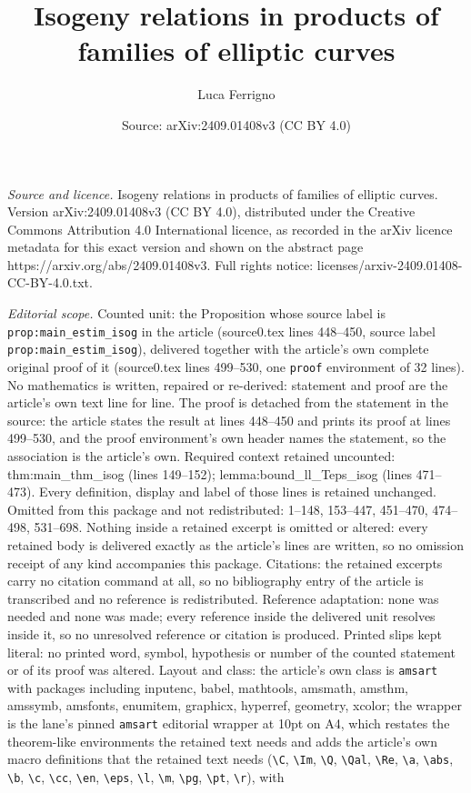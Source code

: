 \documentclass[10pt,a4paper]{amsart}
\title[Isogeny relations in products of families of elliptic curves]{Isogeny relations in products of families of elliptic curves}
\author{Luca Ferrigno}
\date{Source: arXiv:2409.01408v3 (CC BY 4.0)}
\begin{document}
\maketitle

\noindent\emph{Source and licence.} Isogeny relations in products of families of elliptic curves. Version arXiv:2409.01408v3 (CC BY 4.0), distributed under the Creative Commons Attribution 4.0 International licence, as recorded in the arXiv licence metadata for this exact version and shown on the abstract page https://arxiv.org/abs/2409.01408v3. Full rights notice: licenses/arxiv-2409.01408-CC-BY-4.0.txt.\par\smallskip

\noindent\textit{Editorial scope.} Counted unit: the Proposition whose source label is \texttt{prop:main\_estim\_isog} in the article (source0.tex lines 448--450, source label \texttt{prop:main\_estim\_isog}), delivered together with the article's own complete original proof of it (source0.tex lines 499--530, one \texttt{proof} environment of 32 lines). No mathematics is written, repaired or re-derived: statement and proof are the article's own text line for line. The proof is detached from the statement in the source: the article states the result at lines 448--450 and prints its proof at lines 499--530, and the proof environment's own header names the statement, so the association is the article's own. Required context retained uncounted: thm:main\_thm\_isog (lines 149--152); lemma:bound\_ll\_Teps\_isog (lines 471--473). Every definition, display and label of those lines is retained unchanged. Omitted from this package and not redistributed: 1--148, 153--447, 451--470, 474--498, 531--698. Nothing inside a retained excerpt is omitted or altered: every retained body is delivered exactly as the article's lines are written, so no omission receipt of any kind accompanies this package. Citations: the retained excerpts carry no citation command at all, so no bibliography entry of the article is transcribed and no reference is redistributed. Reference adaptation: none was needed and none was made; every reference inside the delivered unit resolves inside it, so no unresolved reference or citation is produced. Printed slips kept literal: no printed word, symbol, hypothesis or number of the counted statement or of its proof was altered. Layout and class: the article's own class is \texttt{amsart} with packages including inputenc, babel, mathtools, amsmath, amsthm, amssymb, amsfonts, enumitem, graphicx, hyperref, geometry, xcolor; the wrapper is the lane's pinned \texttt{amsart} editorial wrapper at 10pt on A4, which restates the theorem-like environments the retained text needs and adds the article's own macro definitions that the retained text needs (\texttt{\textbackslash C}, \texttt{\textbackslash Im}, \texttt{\textbackslash Q}, \texttt{\textbackslash Qal}, \texttt{\textbackslash Re}, \texttt{\textbackslash a}, \texttt{\textbackslash abs}, \texttt{\textbackslash b}, \texttt{\textbackslash c}, \texttt{\textbackslash cc}, \texttt{\textbackslash en}, \texttt{\textbackslash eps}, \texttt{\textbackslash l}, \texttt{\textbackslash m}, \texttt{\textbackslash pg}, \texttt{\textbackslash pt}, \texttt{\textbackslash r}), with 
\end{document}
